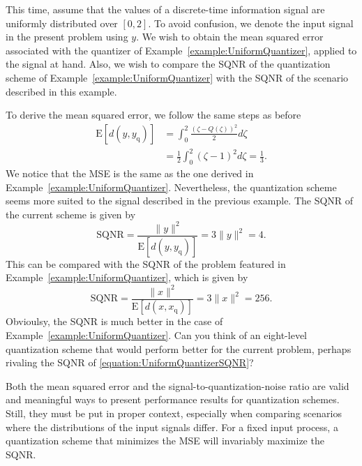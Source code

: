 \begin{example}
This time, assume that the values of a discrete-time information signal are uniformly distributed over $[0,2]$.
To avoid confusion, we denote the input signal in the present problem using $y$.
We wish to obtain the mean squared error associated with the quantizer of Example~\ref{example:UniformQuantizer}, applied to the signal at hand.
Also, we wish to compare the SQNR of the quantization scheme of Example~\ref{example:UniformQuantizer} with the SQNR of the scenario described in this example.

To derive the mean squared error, we follow the same steps as before
\begin{equation*}
\begin{split}
\mathrm{E} [ d(y, y_{\mathrm{q}}) ]
&= \int_0^{2} \frac{(\zeta - Q(\zeta))^2}{2} d\zeta \\
&= \frac{1}{2} \int_{0}^{2} (\zeta - 1)^2 d\zeta = \frac{1}{3} .
\end{split}
\end{equation*}
We notice that the MSE is the same as the one derived in Example~\ref{example:UniformQuantizer}.
Nevertheless, the quantization scheme seems more suited to the signal described in the previous example.
The SQNR of the current scheme is given by
\begin{equation*}
\text{SQNR} = \frac{\| y \|^2}{\mathrm{E} [ d(y, y_{\mathrm{q}}) ]}
= 3 \| y \|^2 = 4.
\end{equation*}
This can be compared with the SQNR of the problem featured in Example~\ref{example:UniformQuantizer}, which is given by
\begin{equation} \label{equation:UniformQuantizerSQNR}
\text{SQNR} = \frac{\| x \|^2}{\mathrm{E} [ d(x, x_{\mathrm{q}}) ]}
= 3 \| x \|^2 = 256.
\end{equation}
Obvioulsy, the SQNR is much better in the case of Example~\ref{example:UniformQuantizer}.
Can you think of an eight-level quantization scheme that would perform better for the current problem, perhaps rivaling the SQNR of \eqref{equation:UniformQuantizerSQNR}?
\end{example}

Both the mean squared error and the signal-to-quantization-noise ratio are valid and meaningful ways to present performance results for quantization schemes.
Still, they must be put in proper context, especially when comparing scenarios where the distributions of the input signals differ.
For a fixed input process, a quantization scheme that minimizes the MSE will invariably maximize the SQNR.


